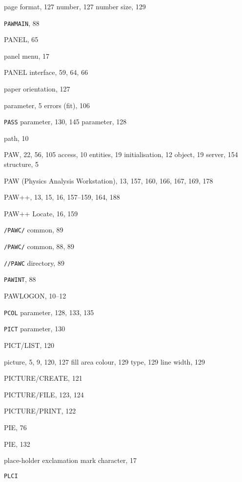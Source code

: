 \begin{theindex}
  \item page
    \subitem format, 127
    \subitem number, 127
    \subitem number size, 129
  \item {\tt  PAWMAIN}, 88
  \item {\ttfamily  PANEL}, 65
  \item panel
    \subitem menu, 17
  \item PANEL interface, 59, 64, 66
  \item paper orientation, 127
  \item parameter, 5
    \subitem errors (fit), 106
  \item {\tt PASS}
     parameter, 130, 145
     parameter, 128
  \item path, 10
  \item PAW, 22, 56, 105
    \subitem access, 10
    \subitem entities, 19
    \subitem initialisation, 12
    \subitem object, 19
    \subitem server, 154
    \subitem structure, 5
  \item PAW (Physics Analysis Workstation), 13, 157, 160, 166, 167, 169, 
		178
  \item PAW++, 13, 15, 16, 157--159, 164, 188
  \item PAW++ Locate, 16, 159
  \item {\tt/PAWC/} common, 89
  \item {\tt  /PAWC/} common, 88, 89
  \item {\tt  //PAWC} directory, 89
  \item {\tt  PAWINT}, 88
  \item PAWLOGON, 10--12
  \item {\tt PCOL}
     parameter, 128, 133, 135
  \item {\tt PICT}
     parameter, 130
  \item {\ttfamily  PICT/LIST}, 120
  \item picture, 5, 9, 120, 127
    \subitem fill area
      \subsubitem colour, 129
      \subsubitem type, 129
    \subitem line width, 129
  \item {\ttfamily  PICTURE/CREATE}, 121
  \item {\ttfamily  PICTURE/FILE}, 123, 124
  \item {\ttfamily  PICTURE/PRINT}, 122
  \item PIE, 76
  \item {\ttfamily  PIE}, 132
  \item place-holder
    \subitem exclamation mark character, 17
  \item {\tt PLCI}

\end{theindex}
